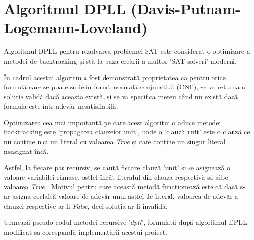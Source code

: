 

\chapter{Algoritmul DPLL (Davis-Putnam-Logemann-Loveland)}

Algoritmul DPLL pentru rezolvarea problemei SAT este considerat o optimizare a metodei de backtracking și stă la baza creării a multor 'SAT solveri' moderni.

În cadrul acestui algoritm a fost demonstrată proprietatea ca pentru orice formulă care se poate scrie în formă normală conjunctivă (CNF), se va returna o soluție validă dacă aceasta există, și se va specifica mereu când nu există dacă formula este într-adevăr nesatisfiabilă.

Optimizarea cea mai importantă pe care acest algoritm o aduce metodei \linebreak backtracking este 'propagarea clauzelor unit', unde o 'clauză unit' este o clauză ce nu conține nici un literal cu valoarea \textit{ True } și care conține un singur literal neasignat încă. 

Astfel, la fiecare pas recursiv, se caută fiecare clauză 'unit' și se asignează o \linebreak valoare variabilei rămase, astfel încât literalul din clauza respectivă să aibe \linebreak valoarea \textit{ True }. Motivul pentru care această metodă funcționează este că dacă s-ar asigna cealaltă valoare de adevăr unui astfel de literal, valoarea de adevăr a clauzei respective ar fi \textit{False}, deci soluția ar fi invalidă.

Urmează pseudo-codul metodei recursive '\textit{dpll}', formulată după algoritmul DPLL modificat sa corespundă implementării acestui proiect.


